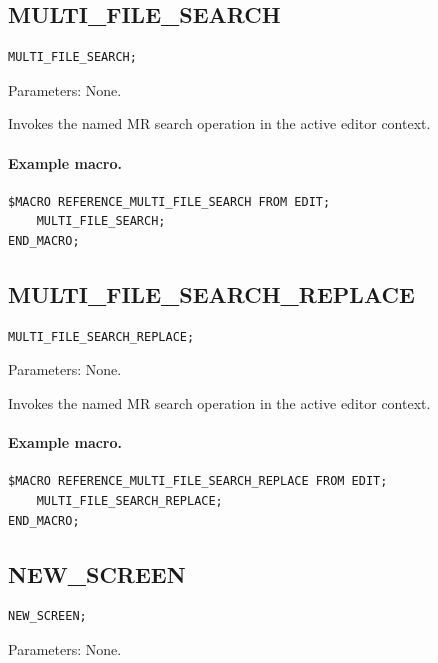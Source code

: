 \documentclass[a4paper,10pt,twoside,openany]{book}
\newenvironment{mrmacextension}{\begin{changebar}}{\end{changebar}}
\begin{document}
\begin{mrmacextension}
\label{prim:procedure-multi-file-search}
\subsection*{MULTI\_FILE\_SEARCH}
\begin{verbatim}
MULTI_FILE_SEARCH;
\end{verbatim}
Parameters: None.

Invokes the named MR search operation in the active editor context.

\paragraph{Example macro.}
\begin{verbatim}
$MACRO REFERENCE_MULTI_FILE_SEARCH FROM EDIT;
    MULTI_FILE_SEARCH;
END_MACRO;
\end{verbatim}
\end{mrmacextension}

\begin{mrmacextension}
\label{prim:procedure-multi-file-search-replace}
\subsection*{MULTI\_FILE\_SEARCH\_REPLACE}
\begin{verbatim}
MULTI_FILE_SEARCH_REPLACE;
\end{verbatim}
Parameters: None.

Invokes the named MR search operation in the active editor context.

\paragraph{Example macro.}
\begin{verbatim}
$MACRO REFERENCE_MULTI_FILE_SEARCH_REPLACE FROM EDIT;
    MULTI_FILE_SEARCH_REPLACE;
END_MACRO;
\end{verbatim}
\end{mrmacextension}

\label{prim:procedure-new-screen}
\subsection*{NEW\_SCREEN}
\begin{verbatim}
NEW_SCREEN;
\end{verbatim}
Parameters: None.
\end{document}

